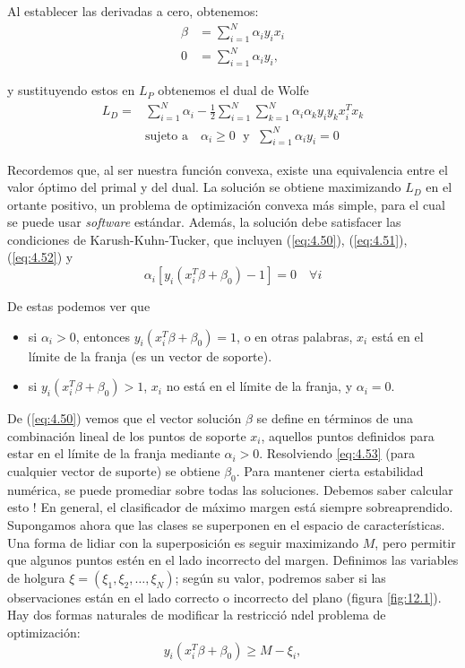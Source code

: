 \noindent Al establecer las derivadas a cero, obtenemos:
\begin{align}
\beta &= \sum_{i=1}^N \alpha_i y_i x_i \label{eq:4.50}\\
0 &= \sum_{i=1}^N \alpha_i y_i, \label{eq:4.51}
\end{align}

\noindent y sustituyendo estos en $L_P$ obtenemos el dual de Wolfe
\begin{align}
L_D =& \sum_{i=1}^N \alpha_i - \frac{1}{2} \sum_{i=1}^N \sum_{k=1}^N \alpha_i \alpha_k y_i y_k x_i^T x_k \\
& \text{sujeto a} \quad \alpha_i \geq 0 \; \text{ y } \; \sum_{i=1}^N \alpha_i y_i = 0 \label{eq:4.52}
\end{align}

Recordemos que, al ser nuestra función convexa, existe una equivalencia entre el valor óptimo del primal y del dual. La solución se obtiene maximizando $L_D$ en el ortante positivo, un problema de optimización convexa más simple, para el cual se puede usar \textit{software} estándar. Además, la solución debe satisfacer las condiciones de Karush-Kuhn-Tucker, que incluyen (\ref{eq:4.50}), (\ref{eq:4.51}), (\ref{eq:4.52}) y
\begin{equation}
\alpha_i [y_i (x_i^T \beta + \beta_0) - 1] = 0 \quad \forall i \label{eq:4.53}
\end{equation}

\noindent De estas podemos ver que
\begin{itemize}
    \item si $\alpha_i > 0$, entonces $y_i (x_i^T \beta + \beta_0) = 1$, o en otras palabras, $x_i$ está en el límite de la franja (es un vector de soporte).
    \item si $y_i (x_i^T \beta + \beta_0) > 1$, $x_i$ no está en el límite de la franja, y $\alpha_i = 0$.
\end{itemize}

De (\ref{eq:4.50}) vemos que el vector solución $\beta$ se define en términos de una combinación lineal de los puntos de soporte $x_i$, aquellos puntos definidos para estar en el límite de la franja mediante $\alpha_i > 0$. Resolviendo \ref{eq:4.53} (para cualquier vector de suporte) se obtiene $\beta_0$. Para mantener cierta estabilidad numérica, se puede promediar sobre todas las soluciones. Debemos saber calcular esto ! En general, el clasificador de máximo margen está siempre sobreaprendido. \\

Supongamos ahora que las clases se superponen en el espacio de características. Una forma de lidiar con la superposición es seguir maximizando $M$, pero permitir que algunos puntos estén en el lado incorrecto del margen. Definimos las variables de holgura $\xi = (\xi_1, \xi_2, \ldots, \xi_N)$; según su valor, podremos saber si las observaciones están en el lado correcto o incorrecto del plano (figura \ref{fig:12.1}). Hay dos formas naturales de modificar la restricció ndel problema de optimización:
\begin{equation}
y_i (x_i^T \beta + \beta_0) \geq M - \xi_i,
\end{equation}

